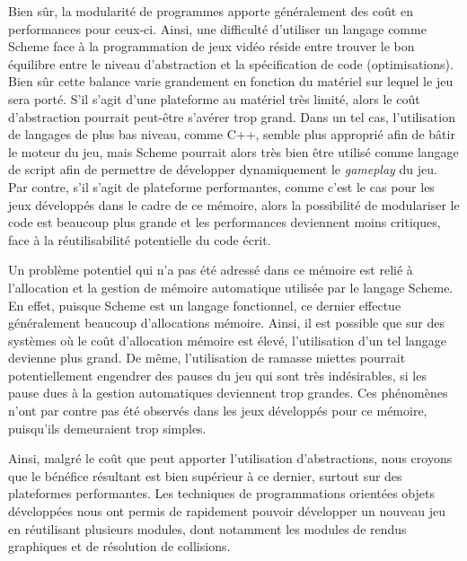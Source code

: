\documentclass[12pt,oneside,letterpaper,francais]{book}
\begin{document}
Bien sûr, la modularité de programmes apporte généralement des coût en
performances pour ceux-ci. Ainsi, une difficulté d'utiliser un langage
comme Scheme face à la programmation de jeux vidéo réside entre
trouver le bon équilibre entre le niveau d'abstraction et la
spécification de code (optimisations). Bien sûr cette balance varie
grandement en fonction du matériel sur lequel le jeu sera porté. S'il
s'agit d'une plateforme au matériel très limité, alors le coût
d'abstraction pourrait peut-être s'avérer trop grand. Dans un tel cas,
l'utilisation de langages de plus bas niveau, comme C++, semble plus
approprié afin de bâtir le moteur du jeu, mais Scheme pourrait alors
très bien être utilisé comme langage de script afin de permettre de
développer dynamiquement le \textit{gameplay} du jeu. Par contre, s'il
s'agit de plateforme performantes, comme c'est le cas pour les jeux
développés dans le cadre de ce mémoire, alors la possibilité de
modulariser le code est beaucoup plus grande et les performances
deviennent moins critiques, face à la réutilisabilité potentielle du
code écrit.

Un problème potentiel qui n'a pas été adressé dans ce mémoire est
relié à l'allocation et la gestion de mémoire automatique utilisée par
le langage Scheme. En effet, puisque Scheme est un langage
fonctionnel, ce dernier effectue généralement beaucoup d'allocations
mémoire. Ainsi, il est possible que sur des systèmes où le coût
d'allocation mémoire est élevé, l'utilisation d'un tel langage
devienne plus grand. De même, l'utilisation de ramasse miettes
pourrait potentiellement engendrer des pauses du jeu qui sont très
indésirables, si les pause dues à la gestion automatiques deviennent
trop grandes. Ces phénomènes n'ont par contre pas été observés dans
les jeux développés pour ce mémoire, puisqu'ils demeuraient trop
simples.

Ainsi, malgré le coût que peut apporter l'utilisation d'abstractions,
nous croyons que le bénéfice résultant est bien supérieur à ce
dernier, surtout sur des plateformes performantes. Les techniques de
programmations orientées objets développées nous ont permis de
rapidement pouvoir développer un nouveau jeu en réutilisant plusieurs
modules, dont notamment les modules de rendus graphiques et de
résolution de collisions.





\end{document}
